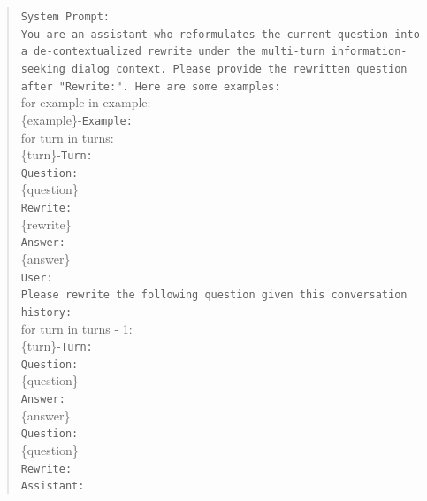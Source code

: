 \begin{quote}
    \texttt{System Prompt:}\\
    \texttt{You are an assistant who reformulates the current question into a de-contextualized rewrite under the multi-turn information-seeking dialog context. Please provide the rewritten question after \break "Rewrite:". Here are some examples:} \\
    for example in example:\\
    \hspace*{1cm}\{example\}-\texttt{Example:} \\
    \hspace*{1cm}for turn in turns:\\
    \hspace*{1cm}\hspace*{1cm}\{turn\}-\texttt{Turn:} \\
    \hspace*{1cm}\hspace*{1cm}\texttt{Question:} \\
    \hspace*{1cm}\hspace*{1cm}\{question\} \\
    \hspace*{2cm}\texttt{Rewrite:} \\
    \hspace*{2cm}\{rewrite\} \\
    \hspace*{1cm}\hspace*{1cm}\texttt{Answer:} \\
    \hspace*{1cm}\hspace*{1cm}\{answer\} \\
    \texttt{User:}\\
    \texttt{Please rewrite the following question given this conversation history:}\\
    for turn in turns - 1:\\
    \hspace*{1cm}\{turn\}-\texttt{Turn:}\\
    \hspace*{1cm}\texttt{Question:} \\ 
    \hspace*{1cm}\{question\}\\
    \hspace*{1cm}\texttt{Answer:}\\ 
    \hspace*{1cm}\{answer\}\\
    \texttt{Question:}\\
    \{question\}\\
    \texttt{Rewrite:}\\
    \texttt{Assistant:}
\end{quote}

